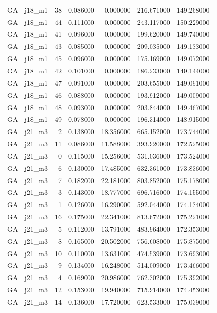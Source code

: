 \begin{tabular}{llrrrrr}
GA & j18_m1 & 38 & 0.086000 & 0.000000 & 216.671000 & 149.268000 \\
GA & j18_m1 & 44 & 0.111000 & 0.000000 & 243.117000 & 150.229000 \\
GA & j18_m1 & 41 & 0.096000 & 0.000000 & 199.620000 & 149.740000 \\
GA & j18_m1 & 43 & 0.085000 & 0.000000 & 209.035000 & 149.133000 \\
GA & j18_m1 & 45 & 0.096000 & 0.000000 & 175.169000 & 149.072000 \\
GA & j18_m1 & 42 & 0.101000 & 0.000000 & 186.233000 & 149.144000 \\
GA & j18_m1 & 47 & 0.091000 & 0.000000 & 203.655000 & 149.091000 \\
GA & j18_m1 & 46 & 0.088000 & 0.000000 & 193.912000 & 149.009000 \\
GA & j18_m1 & 48 & 0.093000 & 0.000000 & 203.844000 & 149.467000 \\
GA & j18_m1 & 49 & 0.078000 & 0.000000 & 196.314000 & 148.915000 \\
GA & j21_m3 & 2 & 0.138000 & 18.356000 & 665.152000 & 173.744000 \\
GA & j21_m3 & 11 & 0.086000 & 11.588000 & 393.920000 & 172.525000 \\
GA & j21_m3 & 0 & 0.115000 & 15.256000 & 531.036000 & 173.524000 \\
GA & j21_m3 & 6 & 0.130000 & 17.485000 & 632.361000 & 173.836000 \\
GA & j21_m3 & 7 & 0.182000 & 22.181000 & 803.852000 & 175.178000 \\
GA & j21_m3 & 3 & 0.143000 & 18.777000 & 696.716000 & 174.155000 \\
GA & j21_m3 & 1 & 0.126000 & 16.290000 & 592.044000 & 174.134000 \\
GA & j21_m3 & 16 & 0.175000 & 22.341000 & 813.672000 & 175.221000 \\
GA & j21_m3 & 5 & 0.112000 & 13.791000 & 483.964000 & 172.353000 \\
GA & j21_m3 & 8 & 0.165000 & 20.502000 & 756.608000 & 175.875000 \\
GA & j21_m3 & 10 & 0.110000 & 13.631000 & 474.539000 & 173.693000 \\
GA & j21_m3 & 9 & 0.134000 & 16.248000 & 514.009000 & 173.466000 \\
GA & j21_m3 & 4 & 0.169000 & 20.986000 & 762.302000 & 175.392000 \\
GA & j21_m3 & 12 & 0.153000 & 19.940000 & 715.914000 & 174.453000 \\
GA & j21_m3 & 14 & 0.136000 & 17.720000 & 623.533000 & 175.039000 \\

\end{tabular}
